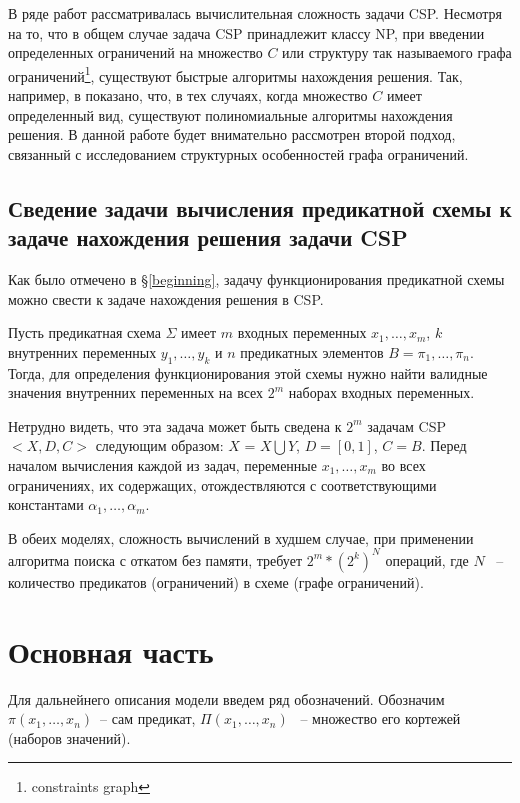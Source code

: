 \documentclass[12pt]{article}
\begin{document}
В ряде работ рассматривалась вычислительная сложность задачи CSP. Несмотря на то, что в общем случае задача CSP
принадлежит классу NP, при введении определенных ограничений на множество $C$ или структуру так называемого
графа ограничений\footnote{constraints graph}, существуют быстрые алгоритмы нахождения решения. 
Так, например, в \cite{Shaeffer78} показано, 
что, в тех случаях, когда множество $C$ имеет определенный вид, существуют полиномиальные алгоритмы нахождения решения.
В данной работе будет внимательно рассмотрен второй подход, связанный с исследованием структурных особенностей 
графа ограничений. 

\subsection{Сведение задачи вычисления предикатной схемы к задаче нахождения решения задачи CSP}
Как было отмечено в \S \ref{beginning}, задачу функционирования предикатной схемы можно свести к задаче нахождения решения в CSP. 

Пусть предикатная схема $\Sigma$ имеет $m$ входных переменных $x_1, \ldots , x_m$, 
$k$ внутренних переменных $y_1, \ldots , y_k$ и $n$ предикатных элементов $B = \pi_1, \dots , \pi_n$. 
Тогда, для определения функционирования этой схемы нужно найти валидные значения внутренних переменных на всех $2^{m}$
наборах входных переменных. 

Нетрудно видеть, что эта задача может быть сведена к $2^m$ задачам CSP $<X, D, C>$ следующим образом:
$X$ = $X \bigcup Y$, $D = [0, 1]$, $C = B$. Перед началом вычисления каждой из задач, переменные $x_1, \ldots , x_m$ 
во всех ограничениях, их содержащих, отождествляются с соответствующими константами $\alpha_1, \ldots , \alpha_m$.

В обеих моделях, сложность вычислений в худшем случае, при применении алгоритма поиска 
с откатом без памяти, требует $2^m * (2^k)^N$ операций, где $N$ ~-- количество предикатов (ограничений) 
в схеме (графе ограничений).

\section{Основная часть}

Для дальнейнего описания модели введем ряд обозначений.
Обозначим $\pi(x_1, \dots, x_n)$~-- сам предикат, $\Pi(x_1, \dots, x_n)$ ~-- множество его кортежей (наборов значений).
\end{document}
